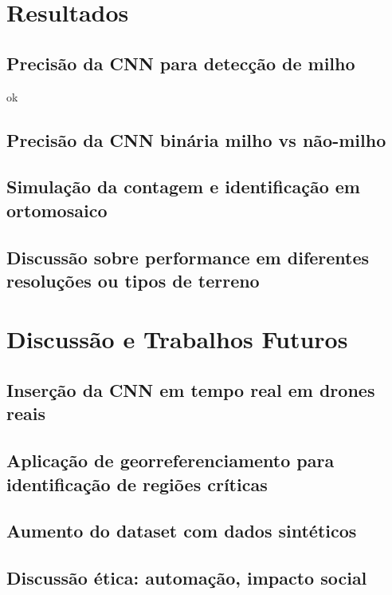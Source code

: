 \documentclass[10pt,conference]{IEEEtran}
\begin{document}
\section{Resultados}
\subsection{Precisão da CNN para detecção de milho}
ok
\subsection{Precisão da CNN binária milho vs não-milho}
\subsection{Simulação da contagem e identificação em ortomosaico}
\subsection{Discussão sobre performance em diferentes resoluções ou tipos de terreno}

\section{Discussão e Trabalhos Futuros}
\subsection{Inserção da CNN em tempo real em drones reais}
\subsection{Aplicação de georreferenciamento para identificação de regiões críticas}
\subsection{Aumento do dataset com dados sintéticos}
\subsection{Discussão ética: automação, impacto social}



\end{document}
